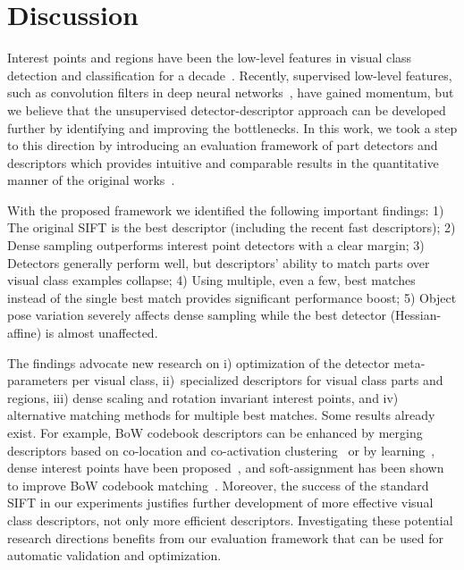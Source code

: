 \documentclass[10pt,journal,cspaper,compsoc]{IEEEtran}
\begin{document}
%
\section{Discussion}
%
Interest points and regions have been the low-level features in
visual class detection and classification for a decade~\cite{SivZis:2003}.
Recently, supervised low-level features, such as
convolution filters in deep neural
networks~\cite{KriSutHin:2012}, have gained momentum, but we
believe that the unsupervised detector-descriptor
approach can be developed further by identifying and improving
the bottlenecks.
In this work, we took a step to this direction by introducing
an evaluation framework of
part detectors and descriptors which provides intuitive
and comparable results in the quantitative manner of the original
works~\cite{MikTuySch:2005,MikSch:2005}.

With the proposed framework we identified the following
important findings:
1) The original SIFT is the best descriptor (including the recent fast descriptors);
2) Dense sampling outperforms interest point detectors with a clear margin;
3) Detectors generally perform well, but descriptors' ability to match
parts over visual class examples collapse;
4) Using multiple, even a few, best matches instead of the single best match
provides significant performance boost;
5) Object pose variation severely affects dense sampling
while the best detector (Hessian-affine) is almost unaffected.

The findings advocate new research on i) optimization of the detector
meta-parameters per visual class, ii)~specialized descriptors
for visual class parts and regions, iii) dense scaling and rotation
invariant interest points, and iv) alternative matching methods for
multiple best matches. Some results already exist.
For example, BoW codebook descriptors can be enhanced by merging
descriptors based on co-location and co-activation
clustering~\cite{LeiEttSch:2008} or by learning~\cite{SimVedZis:2014}, dense interest points have
been proposed~\cite{Tuy:2010}, and soft-assignment has been shown
to improve BoW codebook matching~\cite{AgaTri:2008}.
Moreover, the success of the standard SIFT in our experiments
justifies further development of more effective visual class
descriptors, not only more efficient descriptors. Investigating
these potential research directions benefits from our evaluation
framework that can be used for automatic validation and optimization.
\end{document}
